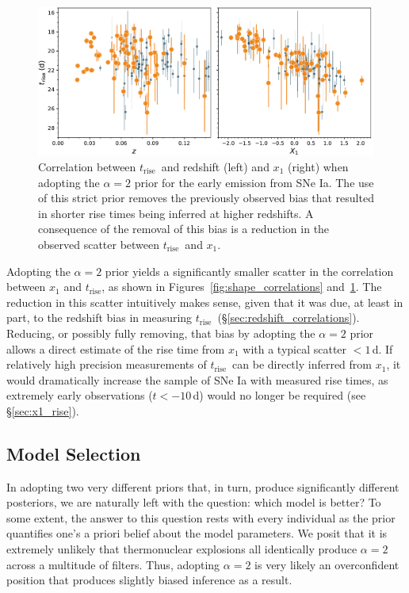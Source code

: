 \documentclass[twocolumn]{aastex63}
\newcommand{\trise}{$t_\mathrm{rise}$}
\begin{document}
\begin{figure}
    \centering
    \includegraphics[width=6in]{./figures/trise_z_tsquared.pdf}
    \caption{Correlation between \trise\ and redshift (left) and $x_1$ (right)
    when adopting the $\alpha = 2$ prior for the early emission from SNe Ia.
    The use of this strict prior removes the previously observed bias that
    resulted in shorter rise times being inferred at higher redshifts. A
    consequence of the removal of this bias is a reduction in the observed
    scatter between \trise\ and $x_1$.}
    \label{fig:tsquared_z_evolution}
\end{figure}


Adopting the $\alpha = 2$ prior yields a significantly smaller scatter in the
correlation between $x_1$ and \trise, as shown in
Figures~\ref{fig:shape_correlations} and~\ref{fig:tsquared_z_evolution}. The
reduction in this scatter intuitively makes sense, given that it was due, at
least in part, to the redshift bias in measuring \trise\
(\S\ref{sec:redshift_correlations}). Reducing, or possibly fully removing,
that bias by adopting the $\alpha = 2$ prior allows a direct estimate of the
rise time from $x_1$ with a typical scatter $< 1$\,d. If relatively high
precision measurements of \trise\ can be directly inferred from $x_1$, it
would dramatically increase the sample of SNe Ia with measured rise times, as
extremely early observations ($t < -10$\,d) would no longer be required (see
\S\ref{sec:x1_rise}).

\subsection{Model Selection}\label{sec:dic}

In adopting two very different priors that, in turn, produce significantly
different posteriors, we are naturally left with the question: which model is
better? To some extent, the answer to this question rests with every individual
as the prior quantifies one's a priori belief about the model parameters. We
posit that it is extremely unlikely that thermonuclear explosions all
identically produce $\alpha = 2$ across a multitude of filters. Thus, adopting
$\alpha = 2$ is very likely an overconfident position that produces slightly
biased inference as a result.
\end{document}
